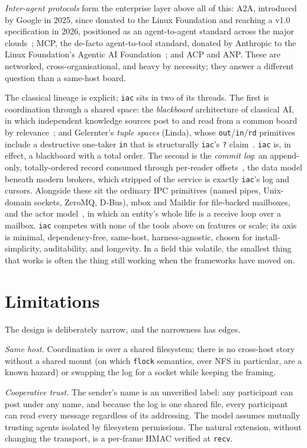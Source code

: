 \documentclass[11pt]{article}
\newcommand{\code}[1]{\texttt{#1}}
\begin{document}
\emph{Inter-agent protocols} form the enterprise layer above all of this: A2A, introduced by Google in 2025, since donated to the Linux Foundation and reaching a v1.0 specification in 2026, positioned as an agent-to-agent standard across the major clouds~\cite{a2a}; MCP, the de-facto agent-to-tool standard, donated by Anthropic to the Linux Foundation's Agentic AI Foundation~\cite{mcp}; and ACP and ANP. These are networked, cross-organisational, and heavy by necessity; they answer a different question than a same-host board.

The classical lineage is explicit; \code{iac} sits in two of its threads. The first is coordination through a shared space: the \emph{blackboard} architecture of classical AI, in which independent knowledge sources post to and read from a common board by relevance~\cite{blackboard}; and Gelernter's \emph{tuple spaces} (Linda), whose \code{out}/\code{in}/\code{rd} primitives include a destructive one-taker \code{in} that is structurally \code{iac}'s \code{?} claim~\cite{linda}. \code{iac} is, in effect, a blackboard with a total order. The second is the \emph{commit log}: an append-only, totally-ordered record consumed through per-reader offsets~\cite{kreps,oneil1996}, the data model beneath modern brokers, which stripped of the service is exactly \code{iac}'s log and cursors. Alongside these sit the ordinary IPC primitives (named pipes, Unix-domain sockets, ZeroMQ, D-Bus), mbox and Maildir for file-backed mailboxes, and the actor model~\cite{hewitt1973}, in which an entity's whole life is a receive loop over a mailbox. \code{iac} competes with none of the tools above on features or scale; its axis is minimal, dependency-free, same-host, harness-agnostic, chosen for install-simplicity, auditability, and longevity. In a field this volatile, the smallest thing that works is often the thing still working when the frameworks have moved on.

\section{Limitations}

The design is deliberately narrow, and the narrowness has edges.

\emph{Same host.} Coordination is over a shared filesystem; there is no cross-host story without a shared mount (on which \code{flock} semantics, over NFS in particular, are a known hazard) or swapping the log for a socket while keeping the framing.

\emph{Cooperative trust.} The sender's name is an unverified label: any participant can post under any name, and because the log is one shared file, every participant can read every message regardless of its addressing. The model assumes mutually trusting agents isolated by filesystem permissions. The natural extension, without changing the transport, is a per-frame HMAC verified at \code{recv}.
\end{document}
